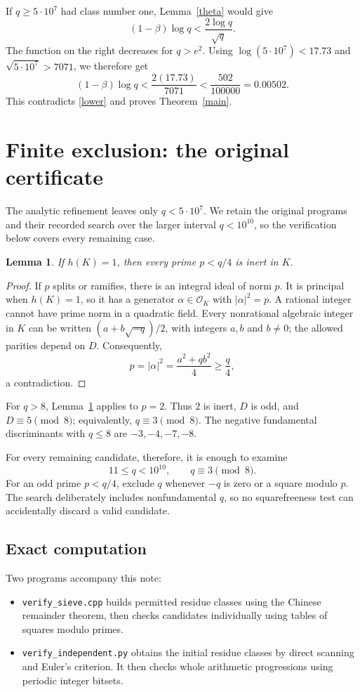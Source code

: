 \documentclass[11pt]{article}
\newtheorem{lemma}[theorem]{Lemma}
\newcommand{\OK}{\mathcal O_K}
\newcommand{\norm}[1]{\lvert #1\rvert}
\begin{document}
If \(q\ge5\cdot10^7\) had class number one, Lemma~\ref{theta} would give
\[
 (1-\beta)\log q<\frac{2\log q}{\sqrt q}.
\]
The function on the right decreases for \(q>e^2\).
Using \(\log(5\cdot10^7)<17.73\) and
\(\sqrt{5\cdot10^7}>7071\), we therefore get
\[
 (1-\beta)\log q
 <\frac{2(17.73)}{7071}
 <\frac{502}{100000}=0.00502.
\]
This contradicts \eqref{lower} and proves Theorem~\ref{main}.

\section{Finite exclusion: the original certificate}\label{finite}

The analytic refinement leaves only \(q<5\cdot10^7\). We retain the
original programs and their recorded search over the larger interval
\(q<10^{10}\), so the verification below covers every remaining case.


\begin{lemma}\label{inert}
If \(h(K)=1\), then every prime \(p<q/4\) is inert in \(K\).
\end{lemma}
\begin{proof}
If \(p\) splits or ramifies, there is an integral ideal of norm \(p\).
It is principal when \(h(K)=1\), so it has a generator
\(\alpha\in\OK\) with \(\norm{\alpha}^2=p\).
A rational integer cannot have prime norm in a quadratic field.
Every nonrational algebraic integer in \(K\) can be written
\((a+b\sqrt{-q})/2\), with integers \(a,b\) and \(b\ne0\);
the allowed parities depend on \(D\).
Consequently,
\[
 p=\norm{\alpha}^2=\frac{a^2+qb^2}{4}\ge\frac q4,
\]
a contradiction.
\end{proof}

For \(q>8\), Lemma~\ref{inert} applies to \(p=2\).
Thus \(2\) is inert, \(D\) is odd, and \(D\equiv5\pmod8\);
equivalently, \(q\equiv3\pmod8\).
The negative fundamental discriminants with \(q\le8\) are
\(-3,-4,-7,-8\).

For every remaining candidate, therefore, it is enough to examine
\[
 11\le q<10^{10},\qquad q\equiv3\pmod8.
\]
For an odd prime \(p<q/4\), exclude \(q\) whenever \(-q\) is zero
or a square modulo \(p\).
The search deliberately includes nonfundamental \(q\), so no
squarefreeness test can accidentally discard a valid candidate.

\subsection*{Exact computation}
Two programs accompany this note:
\begin{itemize}
\item \texttt{verify\_sieve.cpp} builds permitted residue classes using
the Chinese remainder theorem, then checks candidates individually
using tables of squares modulo primes.
\item \texttt{verify\_independent.py} obtains the initial residue
classes by direct scanning and Euler's criterion. It then checks
whole arithmetic progressions using periodic integer bitsets.
\end{itemize}
\end{document}
